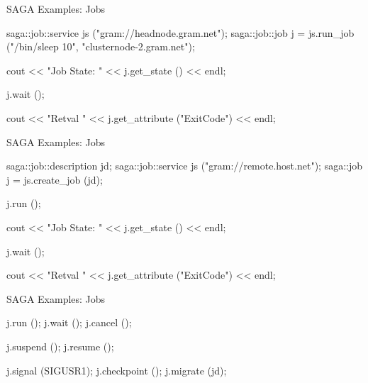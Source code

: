 \documentclass[%
  pdf,
  colorBG,
  slideColor,
  frames,
  ogf
]{prosper}
\begin{document}
 \begin{slide}{SAGA Examples: Jobs}

  \begin{mycode}[label=job submission]

  
  saga::job::service     js ("gram://headnode.gram.net");
  saga::job::job         j = js.run_job ("/bin/sleep 10", 
                                        "clusternode-2.gram.net");


  cout << "Job State: " << j.get_state () << endl;

  j.wait ();

  cout << "Retval " << j.get_attribute ("ExitCode") << endl;

  \end{mycode}
   
 \end{slide}


 \begin{slide}{SAGA Examples: Jobs}

  \begin{mycode}[label=job submission]

  saga::job::description jd;
  saga::job::service     js ("gram://remote.host.net");
  saga::job              j = js.create_job (jd);

  j.run ();

  cout << "Job State: " << j.get_state () << endl;

  j.wait ();

  cout << "Retval " << j.get_attribute ("ExitCode") << endl;

  \end{mycode}
   
 \end{slide}


 \begin{slide}{SAGA Examples: Jobs}

  \begin{mycode}[label=jobs (cont.)]

  j.run     ();
  j.wait    ();
  j.cancel  ();

  j.suspend ();
  j.resume  ();

  j.signal     (SIGUSR1);
  j.checkpoint ();
  j.migrate    (jd);

  \end{mycode}
   
 \end{slide}
\end{document}
